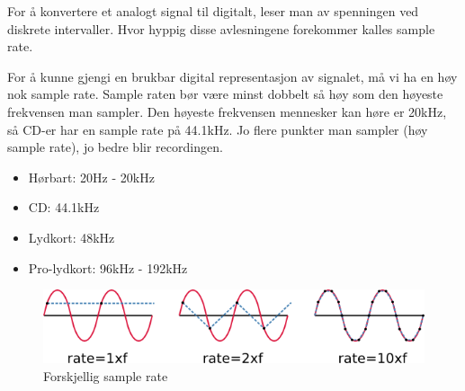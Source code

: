 For å konvertere et analogt signal til digitalt, leser man av spenningen
ved diskrete intervaller.
Hvor hyppig disse avlesningene forekommer kalles sample rate.

For å kunne gjengi en brukbar digital representasjon av signalet, må vi ha
en høy nok sample rate.
Sample raten bør være minst dobbelt så høy som den høyeste frekvensen
man sampler.
Den høyeste frekvensen mennesker kan høre er 20kHz, så CD-er har en sample rate
på 44.1kHz.
Jo flere punkter man sampler (høy sample rate), jo bedre blir recordingen.

\begin{itemize}
\item Hørbart: 20Hz - 20kHz
\item CD: 44.1kHz
\item Lydkort: 48kHz
\item Pro-lydkort: 96kHz - 192kHz
\end{itemize}

\begin{figure}[H]
  \centering
  \caption{Forskjellig sample rate}
  \includegraphics[width=\textwidth]{./img/samplerate}
\end{figure}
